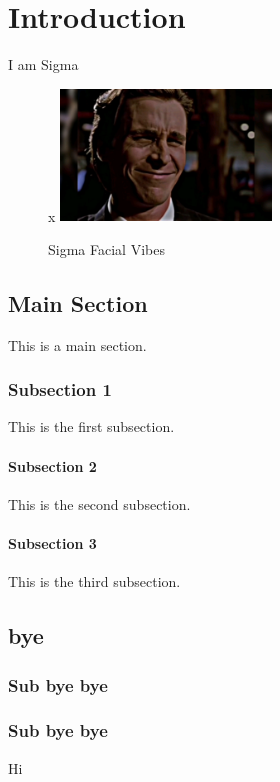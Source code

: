 \documentclass[a4paper,12pt]{book}
\begin{document}
	\chapter{Introduction}
	I am Sigma
	\begin{figure}[h]  %
		\centering
x		\includegraphics[width=0.5\textwidth]{temp.jpeg}
		\caption{Sigma Facial Vibes}
		\label{fig:sample}
	\end{figure}
	

	
	\section{Main Section}
	This is a main section.
	
	\subsection{Subsection 1}
	This is the first subsection.
	
	\subsubsection{Subsection 2}
	This is the second subsection.
	
	\subsubsection{Subsection 3}
	This is the third subsection.
	
	\section{bye}
	
	\subsection{Sub bye bye}
	
	\subsection{Sub bye bye}
	Hi
\end{document}
